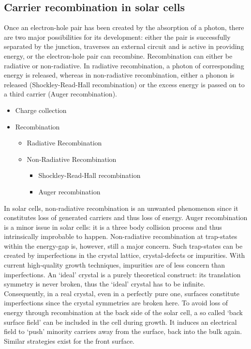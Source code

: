 \subsection{Carrier recombination in \gaas solar cells}
Once an electron-hole pair has been created by the absorption of a photon, there are two major possibilities for its development: either the pair is successfully separated by the junction, traverses an external circuit and is active in providing energy, or the electron-hole pair can recombine. Recombination can either be radiative or non-radiative. In radiative recombination, a photon of corresponding energy is released, whereas in non-radiative recombination, either a phonon is released (Shockley-Read-Hall recombination) or the excess energy is passed on to a third carrier (Auger recombination).
\begin{itemize}
\item Charge collection
\item Recombination
	\begin{itemize}
	\item Radiative Recombination
	\item Non-Radiative Recombination
		\begin{itemize}
		\item Shockley-Read-Hall  recombination
		\item Auger recombination
		\end{itemize}
	\end{itemize}
\end{itemize}
In solar cells, non-radiative recombination is an unwanted phenomenon since it constitutes loss of generated carriers and thus loss of energy. Auger recombination is a minor issue in \threefive solar cells: it is a three body collision process and thus intrinsically improbable to happen. Non-radiative recombination at trap-states within the energy-gap is, however, still a major concern. Such trap-states can be created by imperfections in the crystal lattice, crystal-defects or impurities. With current high-quality \gaas growth techniques, impurities are of less concern than imperfections.
An `ideal' crystal is a purely theoretical construct: its translation symmetry is never broken, thus the `ideal' crystal has to be infinite. Consequently, in a real crystal, even in a perfectly pure one, surfaces constitute imperfections since the crystal symmetries are broken here.
To avoid loss of energy through recombination at the back side of the solar cell, a so called `back surface field'  can be included in the cell during growth. It induces an electrical field to `push' minority carriers away from the surface, back into the bulk again. Similar strategies exist for the front surface.

